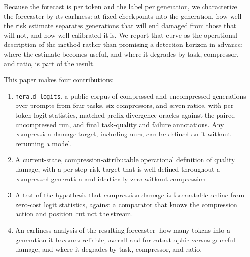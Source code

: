 Because the forecast is per token and the label per generation, we
characterize the forecaster by its earliness: at fixed checkpoints into the
generation, how well the risk estimate separates generations that will end
damaged from those that will not, and how well calibrated it is. We report
that curve as the operational description of the method rather than
promising a detection horizon in advance; where the estimate becomes useful,
and where it degrades by task, compressor, and ratio, is part of the result.


This paper makes four contributions:

\begin{enumerate}
  \item \texttt{herald-logits}, a public corpus of  compressed
  and uncompressed generations over  prompts from four tasks, six
  compressors, and seven ratios, with per-token logit statistics,
  matched-prefix divergence oracles against the paired uncompressed run, and
  final task-quality and failure annotations. Any compression-damage target,
  including ours, can be defined on it without rerunning a model.
  \item A current-state, compression-attributable operational definition of
  quality damage, with a per-step risk target that is well-defined
  throughout a compressed generation and identically zero without
  compression.
  \item A test of the hypothesis that compression damage is forecastable
  online from zero-cost logit statistics, against a comparator that knows
  the compression action and position but not the stream.
  \item An earliness analysis of the resulting forecaster: how many tokens
  into a generation it becomes reliable, overall and for catastrophic versus
  graceful damage, and where it degrades by task, compressor, and ratio.
\end{enumerate}
